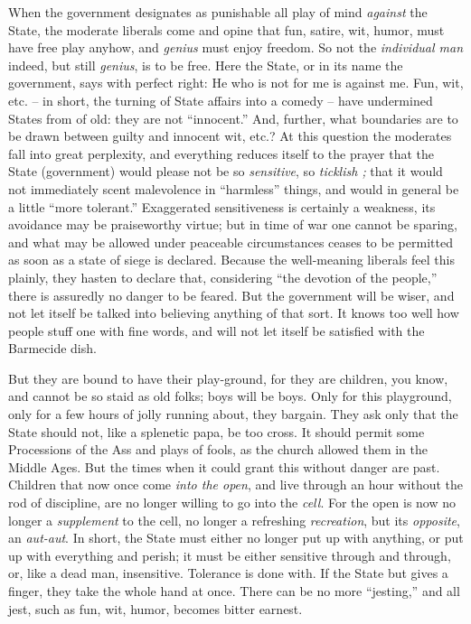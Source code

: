 \documentclass[12pt,a4paper]{book}
\begin{document}
When the government designates as punishable all play of mind \textit{against} 
the State, the moderate liberals come and opine that fun, satire, wit, humor, 
must have free play anyhow, and \textit{genius} must enjoy freedom. So not the 
\textit{individual man} indeed, but still \textit{genius}, is to be free. Here 
the State, or in its name the government, says with perfect right: He who is 
not for me is against me. Fun, wit, etc. -- in short, the turning of State 
affairs into a comedy -- have undermined States from of old: they are not 
``innocent.'' And, further, what boundaries are to be drawn between guilty 
and innocent wit, etc.? At this question the moderates fall into great 
perplexity, and everything reduces itself to the prayer that the State 
(government) would please not be so \textit{sensitive}, so \textit{ticklish ;} 
that it would not immediately scent malevolence in ``harmless'' things, and 
would in general be a little ``more tolerant.'' Exaggerated sensitiveness is 
certainly a weakness, its avoidance may be praiseworthy virtue; but in time of 
war one cannot be sparing, and what may be allowed under peaceable 
circumstances ceases to be permitted as soon as a state of siege is declared. 
Because the well-meaning liberals feel this plainly, they hasten to declare 
that, considering ``the devotion of the people,'' there is assuredly no 
danger to be feared. But the government will be wiser, and not let itself be 
talked into believing anything of that sort. It knows too well how people 
stuff one with fine words, and will not let itself be satisfied with the 
Barmecide dish.

But they are bound to have their play-ground, for they are children, you know, 
and cannot be so staid as old folks; boys will be boys. Only for this 
playground, only for a few hours of jolly running about, they bargain. They 
ask only that the State should not, like a splenetic papa, be too cross. It 
should permit some Processions of the Ass and plays of fools, as the church 
allowed them in the Middle Ages. But the times when it could grant this 
without danger are past. Children that now once come \textit{into the open}, 
and live through an hour without the rod of discipline, are no longer willing 
to go into the \textit{cell}. For the open is now no longer a 
\textit{supplement} to the cell, no longer a refreshing \textit{recreation}, 
but its \textit{opposite}, an \textit{aut-aut}. In short, the State must 
either no longer put up with anything, or put up with everything and perish; 
it must be either sensitive through and through, or, like a dead man, 
insensitive. Tolerance is done with. If the State but gives a finger, they 
take the whole hand at once. There can be no more ``jesting,'' and all jest, 
such as fun, wit, humor, becomes bitter earnest.
\end{document}
